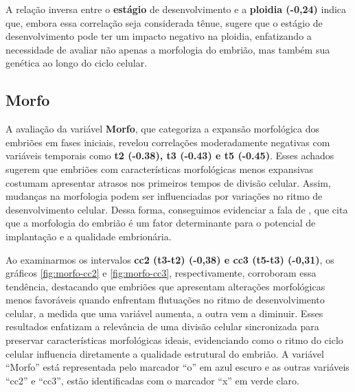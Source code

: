 A relação inversa entre o \textbf{estágio} de desenvolvimento e a \textbf{ploidia (-0,24)} indica que, embora essa correlação seja considerada tênue, sugere que o estágio de desenvolvimento pode ter um impacto negativo na ploidia, enfatizando a necessidade de avaliar não apenas a morfologia do embrião, mas também sua genética ao longo do ciclo celular. 

\subsection*{Morfo}
A avaliação da variável \textbf{Morfo}, que categoriza a expansão morfológica dos embriões em fases iniciais, revelou correlações moderadamente negativas com variáveis temporais como \textbf{t2 (-0.38), t3 (-0.43) e t5 (-0.45)}. Esses achados sugerem que embriões com características morfológicas menos expansivas costumam apresentar atrasos nos primeiros tempos de divisão celular. Assim, mudanças na morfologia podem ser influenciadas por variações no ritmo de desenvolvimento celular. Dessa forma, conseguimos evidenciar a fala de , que cita que a morfologia do embrião é um fator determinante para o potencial de implantação e a qualidade embrionária. 

Ao examinarmos os intervalos \textbf{cc2 (t3-t2) (-0,38) e cc3 (t5-t3) (-0,31)}, os gráficos \ref{fig:morfo-cc2} e \ref{fig:morfo-cc3}, respectivamente, corroboram essa tendência, destacando que embriões que apresentam alterações morfológicas menos favoráveis quando enfrentam flutuações no ritmo de desenvolvimento celular, a medida que uma variável aumenta, a outra vem a diminuir. Esses resultados enfatizam a relevância de uma divisão celular sincronizada para preservar características morfológicas ideais, evidenciando como o ritmo do ciclo celular influencia diretamente a qualidade estrutural do embrião. A variável “Morfo” está representada pelo marcador “o” em azul escuro e as outras variáveis “cc2” e “cc3”, estão identificadas com o marcador “x” em verde claro.


